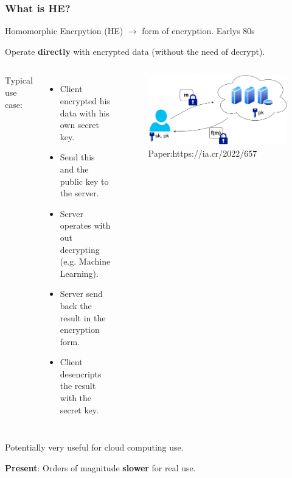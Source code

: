 \documentclass[10pt,handout]{beamer}
\begin{document}
\begin{frame}
\frametitle{What is HE?}


    Homomorphic Encrpytion (HE) $\rightarrow$ form of encryption. Earlys 80s
\vspace{-0.3cm}

    Operate \textbf{directly} with encrypted data (without the need of decrypt).
\vspace{0.3cm}
  \begin{columns}
Typical use case:
\begin{itemize}
    \item Client encrypted his data with his own secret key.
    \item Send this and the public key to the server.
    \item Server operates with out decrypting (e.g. Machine Learning).
    \item Server send back the result in the encryption form.
    \item Client desencripts the result with the secret key.
\end{itemize}



\begin{figure}[h!]
    \centering
    \includegraphics[scale=0.1]{fhe.jpg}
    \caption{Paper:https://ia.cr/2022/657}
\end{figure}
\end{columns}
 \vspace{-0.3cm}


Potentially very useful for cloud computing use.
 \vspace{-0.3cm}

 \pause
    \textbf{Present}: Orders of magnitude \textbf{slower} for real use.


\end{frame}
\end{document}
